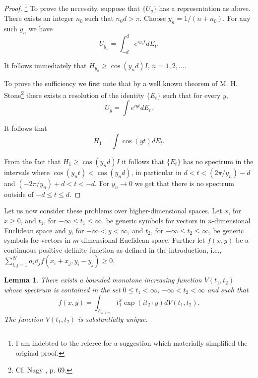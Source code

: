 \documentclass{article}
\newtheorem{lemma}{Lemma}
\begin{document}
\begin{proof}\footnote{I am indebted to the referee for a suggestion which materially simplified the original proof.}
To prove the necessity, suppose that $\{U_y\}$ has a representation as above. There exists an integer $n_0$ such that $n_0 d > \pi$. Choose $y_n = 1/(n+n_0)$. For any such $y_n$ we have
\begin{equation}
U_{y_n} = \int_{-d}^d e^{iy_n t} dE_t.
\label{eq:unitary-spectral}
\end{equation}

It follows immediately that $H_{y_n} \geq \cos(y_n d) I$, $n = 1, 2, \ldots$.

To prove the sufficiency we first note that by a well known theorem of M. H. Stone\footnote{Cf. Nagy \cite{nagy}, p. 69.} there exists a resolution of the identity $\{E_t\}$ such that for every $y$,
\begin{equation}
U_y = \int e^{iyt} dE_t.
\label{eq:stone-representation}
\end{equation}

It follows that
\begin{equation}
H_1 = \int \cos(yt) dE_t.
\label{eq:cosine-integral}
\end{equation}

From the fact that $H_1 \geq \cos(y_n d) I$ it follows that $\{E_t\}$ has no spectrum in the intervals where $\cos(y_n t) < \cos(y_n d)$, in particular in $d < t < (2\pi/y_n) - d$ and $(-2\pi/y_n) + d < t < -d$. For $y_n \to 0$ we get that there is no spectrum outside of $-d \leq t \leq d$.
\end{proof}
Let us now consider these problems over higher-dimensional spaces. Let $x$, for $x \geq 0$, and $t_1$, for $-\infty \leq t_1 \leq \infty$, be generic symbols for vectors in $n$-dimensional Euclidean space and $y$, for $-\infty < y < \infty$, and $t_2$, for $-\infty \leq t_2 \leq \infty$, be generic symbols for vectors in $m$-dimensional Euclidean space. Further let $f(x,y)$ be a continuous positive definite function as defined in the introduction, i.e., $\sum_{i,j=1}^N a_i \overline{a_j} f(x_i + x_j, y_i - y_j) \geq 0$.

\begin{lemma}
\label{lem:higher-dimensional}
There exists a bounded monotone increasing function $V(t_1, t_2)$ whose spectrum is contained in the set $0 \leq t_1 < \infty$, $-\infty < t_2 < \infty$ and such that
\begin{equation}
f(x,y) = \int_{E_{n+m}} t_1^x \exp(i t_2 \cdot y) dV(t_1, t_2).
\label{eq:higher-dimensional-representation}
\end{equation}
The function $V(t_1, t_2)$ is substantially unique.
\end{lemma}
\end{document}

